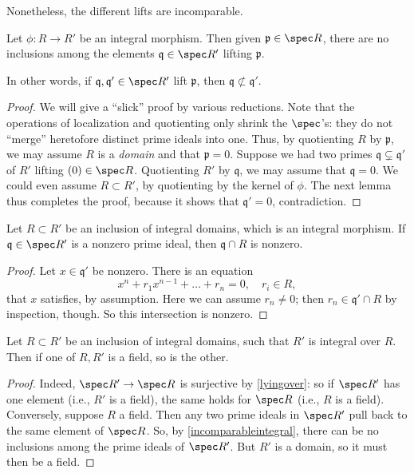 Nonetheless, the different lifts are incomparable.

\begin{proposition} \label{incomparableintegral}
Let $\phi: R \to R'$ be an integral morphism. Then given $\mathfrak{p} \in
\spec R$, there are no inclusions among the elements $\mathfrak{q} \in \spec
R'$ lifting $\mathfrak{p}$.
\end{proposition} 
In other words, if $\mathfrak{q}, \mathfrak{q}' \in \spec R'$ lift
$\mathfrak{p}$, then $\mathfrak{q} \not\subset \mathfrak{q}'$.
\begin{proof} 
We will give a ``slick'' proof by various reductions.
Note that the operations of localization and quotienting only shrink the
$\spec$'s: they do not ``merge'' heretofore distinct prime ideals into one.
Thus, by quotienting $R$ by $\mathfrak{p}$, we may assume $R$ is a
\emph{domain} and that $\mathfrak{p} = 0$.
Suppose we had two primes $\mathfrak{q} \subsetneq \mathfrak{q}'$ of $R'$
lifting $(0) \in \spec R$.
Quotienting $R'$ by $\mathfrak{q}$, we may assume that $\mathfrak{q}  = 0$.
We could even assume $R \subset R'$, by quotienting by the kernel of $\phi$.
The next lemma thus completes the proof, because it shows that $\mathfrak{q}'
= 0$, contradiction.
\end{proof} 

\begin{lemma} 
Let $R \subset R'$ be an inclusion of integral domains, which is an integral
morphism. If $\mathfrak{q} \in \spec R'$ is a nonzero prime ideal, then
$\mathfrak{q} \cap R$ is nonzero.
\end{lemma} 
\begin{proof} 
Let $x \in \mathfrak{q}'$ be nonzero. There is an equation
\[ x^n + r_1 x^{n-1} + \dots + r_n = 0,  \quad r_i \in R, \]
that $x$ satisfies, by assumption. 
Here we can assume $r_n \neq 0$; then $r_n \in \mathfrak{q}' \cap R$ by
inspection, though. So this intersection is nonzero.

\end{proof} 

\begin{corollary} 
Let $R \subset R'$ be an inclusion of integral domains, such that $R'$ is
integral over $R$. Then if one of $R, R'$ is a field, so is the other.
\end{corollary} 
\begin{proof} 
Indeed, $\spec R' \to \spec R$ is surjective by \cref{lyingover}: so if $\spec
R'$ has one element (i.e., $R'$ is a field), the same holds for $\spec R$
(i.e., $R$ is a field). Conversely, suppose $R$ a field. 
Then any two prime ideals in $\spec R'$ pull back to the same element of $\spec
R$. So, by \cref{incomparableintegral}, there can be no inclusions among the prime ideals of $\spec
R'$. But $R'$ is a domain, so it must then be a field.
\end{proof} 


